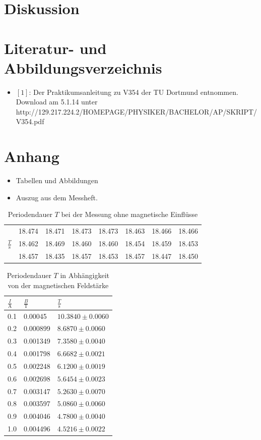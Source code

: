 \documentclass[11pt,ngerman,a4paper]{article}
\begin{document}
\section{Diskussion}

\section{Literatur- und Abbildungsverzeichnis}
\begin{itemize}
\item $[1]$: Der Praktikumsanleitung zu V354 der TU Dortmund entnommen. Download am 5.1.14 unter \newline http://129.217.224.2/HOMEPAGE/PHYSIKER/BACHELOR/AP/SKRIPT/V354.pdf
\end{itemize}
\section{Anhang}
\begin{itemize}
\item Tabellen und Abbildungen
\item Auszug aus dem Messheft.


\end{itemize}

\newpage
\begin{table}[H]
\centering
\begin{tabular}{|c|lllllll|}
\hline
&18.474&18.471&18.473&18.473&18.463&18.466&18.466\\
$\frac{T}{\si{\second}}$ &18.462 & 18.469& 18.460&  18.460 & 18.454&18.459&18.453\\&18.457&18.435&18.457&18.453&18.457&18.447&18.450\\
\hline
\end{tabular}

\caption{Periodendauer $T$ bei der Messung ohne magnetische Einflüsse}
\end{table}
\begin{table}
\centering
\begin{tabular}{lll}
\toprule
{$\frac{I}{\si{\ampere}}$} &{ $\frac{B}{\si{\tesla}}$} &{ $\frac{T}{\si{\second}}$ }\\
\midrule
0.1 & 0.00045 & $10.3840 \pm 0.0060$ \\
0.2 & 0.000899 & $8.6870 \pm 0.0060$ \\
0.3 & 0.001349 & $7.3580 \pm 0.0040$ \\
0.4 & 0.001798 & $6.6682 \pm 0.0021$ \\
0.5 & 0.002248 & $6.1200 \pm 0.0019$ \\
0.6 & 0.002698 & $5.6454 \pm 0.0023$ \\
0.7 & 0.003147 & $5.2630 \pm 0.0070$ \\
0.8 & 0.003597 & $5.0860 \pm 0.0060$ \\
0.9 & 0.004046 & $4.7800 \pm 0.0040$ \\
1.0 & 0.004496 & $4.5216 \pm 0.0022$ \\
\bottomrule
\end{tabular}
\label{}
\caption{Periodendauer $T$ in Abhängigkeit von der magnetischen Feldstärke}
\end{table}
\end{document}
